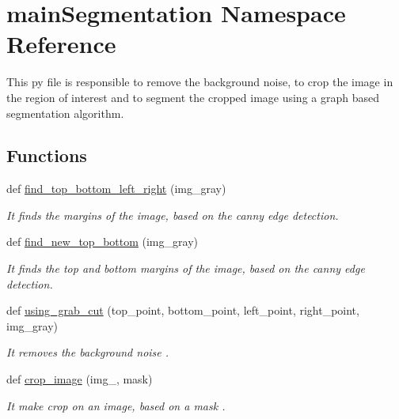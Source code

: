 \hypertarget{namespacemainSegmentation}{}\section{main\+Segmentation Namespace Reference}
\label{namespacemainSegmentation}


This py file is responsible to remove the background noise, to crop the image in the region of interest and to segment the cropped image using a graph based segmentation algorithm.  


\subsection*{Functions}
\begin{DoxyCompactItemize}
\item 
def \hyperlink{namespacemainSegmentation_a5be74b16e6526522552587323de4d0d0}{find\+\_\+top\+\_\+bottom\+\_\+left\+\_\+right} (img\+\_\+gray)
\begin{DoxyCompactList}\small\item\em It finds the margins of the image, based on the canny edge detection. \end{DoxyCompactList}\item 
def \hyperlink{namespacemainSegmentation_a6f3887108c302153d5dc356b7f842709}{find\+\_\+new\+\_\+top\+\_\+bottom} (img\+\_\+gray)
\begin{DoxyCompactList}\small\item\em It finds the top and bottom margins of the image, based on the canny edge detection. \end{DoxyCompactList}\item 
def \hyperlink{namespacemainSegmentation_a048b35fc45a496ca097f03e5f435da08}{using\+\_\+grab\+\_\+cut} (top\+\_\+point, bottom\+\_\+point, left\+\_\+point, right\+\_\+point, img\+\_\+gray)
\begin{DoxyCompactList}\small\item\em It removes the background noise . \end{DoxyCompactList}\item 
def \hyperlink{namespacemainSegmentation_a616c4fb8355aa80f9c15c59e8fc03580}{crop\+\_\+image} (img\+\_\+, mask)
\begin{DoxyCompactList}\small\item\em It make crop on an image, based on a mask . \end{DoxyCompactList}\item 

\end{DoxyCompactItemize}
